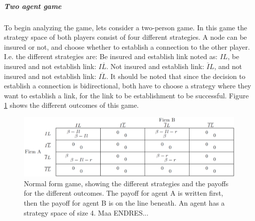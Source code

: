 \subparagraph{Two agent game}
To begin analyzing the game, lets consider a two-person game. In this game the strategy space of both players consist of four different strategies. A node can be insured or not, and choose whether to establish a connection to the other player. I.e. the different strategies are: Be insured and establish link noted as: $IL$, 
be insured and not establish link: $I\overline{L}$. Not insured and establish link: $\overline{I}L$, and not insured and not establish link: $\overline{IL}$. It should be noted that since the decision to establish a connection is bidirectional, both have to choose a strategy where they want to establish a link, for the link to be establishment to be successful.
Figure \ref{fig:FirstGameTheoryModel} shows the different outcomes of this game.

\begin{figure} %
\centering
\includegraphics[width=1.0\textwidth]{../Figures/FirstGameWithParameters.png}
\caption{\label{fig:FirstGameTheoryModel} Normal form game, showing the different strategies and the payoffs  for the different outcomes. The payoff for agent A is written first, then the payoff for agent B is on the line beneath.
 An agent has a strategy space of size 4. Maa ENDRES...}

\end{figure}


